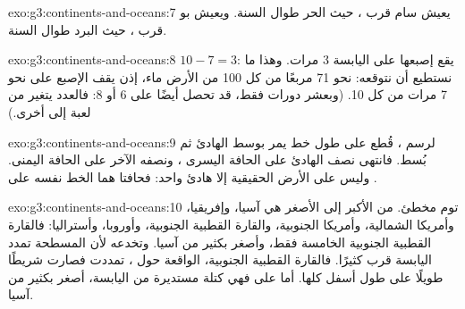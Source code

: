 \begin{solution}{exo:g3:continents-and-oceans:7}
يعيش سام قرب ، حيث الحر طوال السنة. ويعيش بو
قرب ، حيث البرد طوال السنة.
\end{solution}

\begin{solution}{exo:g3:continents-and-oceans:8}
$10 - 7 = 3$: يقع إصبعها على اليابسة 3 مرات. وهذا ما نستطيع أن
نتوقعه: نحو 71 مربعًا من كل 100 من الأرض ماء، إذن يقف الإصبع على  نحو 7 مرات
من كل 10. (وبعشر دورات فقط، قد تحصل أيضًا على 6 أو 8: فالعدد يتغير من لعبة
إلى أخرى.)
\end{solution}

\begin{solution}{exo:g3:continents-and-oceans:9}
لرسم ، قُطع  على طول خط يمر بوسط  الهادئ ثم
بُسط. فانتهى نصف  الهادئ على الحافة اليسرى ، ونصفه الآخر
على الحافة اليمنى. وليس على الأرض الحقيقية إلا  هادئ واحد: فحافتا
 هما الخط نفسه على .
\end{solution}

\begin{solution}{exo:g3:continents-and-oceans:10}
توم مخطئ.  من الأكبر إلى الأصغر هي آسيا، وإفريقيا، وأمريكا
الشمالية، وأمريكا الجنوبية، والقارة القطبية الجنوبية، وأوروبا، وأستراليا:
فالقارة القطبية الجنوبية الخامسة فقط، وأصغر بكثير من آسيا. وتخدعه  لأن  المسطحة تمدد اليابسة قرب  كثيرًا.
فالقارة القطبية الجنوبية، الواقعة حول ، تمددت فصارت شريطًا
طويلًا على طول أسفل  كلها. أما على  فهي كتلة مستديرة من
اليابسة، أصغر بكثير من آسيا.
\end{solution}
